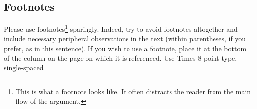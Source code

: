 \documentclass[10pt,twocolumn,letterpaper]{article}
\begin{document}
\subsection{Footnotes}

Please use footnotes\footnote {This is what a footnote looks like.  It
often distracts the reader from the main flow of the argument.} sparingly.
Indeed, try to avoid footnotes altogether and include necessary peripheral
observations in
the text (within parentheses, if you prefer, as in this sentence).  If you
wish to use a footnote, place it at the bottom of the column on the page on
which it is referenced. Use Times 8-point type, single-spaced.






{\small


}
\end{document}
